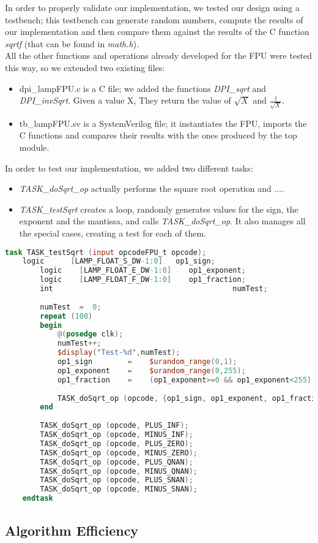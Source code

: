 In order to properly validate our implementation, we tested our design using a testbench; this testbench can generate random numbers, compute the results of our implementation and then compare them against the results of the C function \emph{sqrtf} (that can be found in \emph{math.h}).  \\
All the other functions and operations already developed for the FPU were tested this way, so we extended two existing files:
\begin{itemize}
\item dpi\_lampFPU.c is a C file; we added the functions \emph{DPI\_sqrt} and \emph{DPI\_invSqrt}. Given a value X, They return the value of $\sqrt{X}$ and $\frac{1}{\sqrt{X}}$.
\item tb\_lampFPU.sv is a SystemVerilog file; it instantiates the FPU, imports the C functions and compares their results with the ones produced by the top module. 
\end{itemize}

In order to test our implementation, we added two different tasks:
\begin{itemize}
\item \emph{TASK\_doSqrt\_op} actually performs the square root operation and .... %
\item \emph{TASK\_testSqrt} creates a loop, randomly generates values for the sign, the exponent and the mantissa, and calls  \emph{TASK\_doSqrt\_op}. It also manages all the special cases, creating a test for each of them. 
\end{itemize}

\begin{lstlisting}[language=Verilog]
task TASK_testSqrt (input opcodeFPU_t opcode);
	logic	   [LAMP_FLOAT_S_DW-1:0]   op1_sign;
        logic    [LAMP_FLOAT_E_DW-1:0]    op1_exponent;
        logic    [LAMP_FLOAT_F_DW-1:0]    op1_fraction;
        int                              		    numTest;
        
        numTest  =  0;
        repeat (100)
        begin
            @(posedge clk);
            numTest++;
            $display("Test-%d",numTest);
            op1_sign        =    $urandom_range(0,1);
            op1_exponent    =    $urandom_range(0,255);
            op1_fraction    =    (op1_exponent>=0 && op1_exponent<255) ? $random : $urandom_range(0,1)<<22 /*inf or qnan*/;
        
            TASK_doSqrt_op (opcode, {op1_sign, op1_exponent, op1_fraction});
        end
        
        TASK_doSqrt_op (opcode, PLUS_INF);
        TASK_doSqrt_op (opcode, MINUS_INF);
        TASK_doSqrt_op (opcode, PLUS_ZERO);
        TASK_doSqrt_op (opcode, MINUS_ZERO);
        TASK_doSqrt_op (opcode, PLUS_QNAN);
        TASK_doSqrt_op (opcode, MINUS_QNAN);
        TASK_doSqrt_op (opcode, PLUS_SNAN);
        TASK_doSqrt_op (opcode, MINUS_SNAN);
	endtask
\end{lstlisting}

\subsection{Algorithm Efficiency}



\clearpage